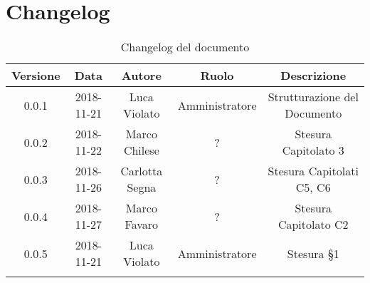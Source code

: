 \section{Changelog}

\begin{center}
\begin{longtable}{|c|c|c|c|c|}
\hline
\textbf{Versione} & \textbf{Data} & \textbf{Autore} & \textbf{Ruolo} & \textbf{Descrizione} \\
\hline \hline
\endfirsthead
0.0.1 & 2018-11-21 & Luca Violato & Amministratore & Strutturazione del Documento \\
0.0.2 & 2018-11-22 & Marco Chilese & ? & Stesura Capitolato 3 \\
0.0.3 & 2018-11-26 & Carlotta Segna & ? & Stesura Capitolati C5, C6 \\
0.0.4 & 2018-11-27 & Marco Favaro & ? & Stesura Capitolato C2 \\
0.0.5 & 2018-11-21 & Luca Violato & Amministratore & Stesura §1 \\
\hline
\caption{Changelog del documento}
\end{longtable}
\end{center}
